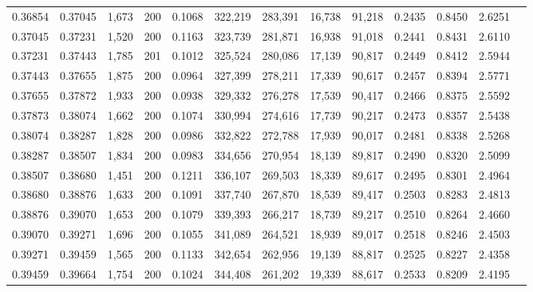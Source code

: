 \begin{tabular}{rrrrrrrrrrrrr}
0.36854 & 0.37045 &  1,673 & 200 &                                     0.1068 & 322,219 & 283,391 &  16,738 &  91,218 & 0.2435 & 0.8450 & 2.6251 \\
0.37045 & 0.37231 &  1,520 & 200 &                                     0.1163 & 323,739 & 281,871 &  16,938 &  91,018 & 0.2441 & 0.8431 & 2.6110 \\
0.37231 & 0.37443 &  1,785 & 201 &                                     0.1012 & 325,524 & 280,086 &  17,139 &  90,817 & 0.2449 & 0.8412 & 2.5944 \\
0.37443 & 0.37655 &  1,875 & 200 &                                     0.0964 & 327,399 & 278,211 &  17,339 &  90,617 & 0.2457 & 0.8394 & 2.5771 \\
0.37655 & 0.37872 &  1,933 & 200 &                                     0.0938 & 329,332 & 276,278 &  17,539 &  90,417 & 0.2466 & 0.8375 & 2.5592 \\
0.37873 & 0.38074 &  1,662 & 200 &                                     0.1074 & 330,994 & 274,616 &  17,739 &  90,217 & 0.2473 & 0.8357 & 2.5438 \\
0.38074 & 0.38287 &  1,828 & 200 &                                     0.0986 & 332,822 & 272,788 &  17,939 &  90,017 & 0.2481 & 0.8338 & 2.5268 \\
0.38287 & 0.38507 &  1,834 & 200 &                                     0.0983 & 334,656 & 270,954 &  18,139 &  89,817 & 0.2490 & 0.8320 & 2.5099 \\
0.38507 & 0.38680 &  1,451 & 200 &                                     0.1211 & 336,107 & 269,503 &  18,339 &  89,617 & 0.2495 & 0.8301 & 2.4964 \\
0.38680 & 0.38876 &  1,633 & 200 &                                     0.1091 & 337,740 & 267,870 &  18,539 &  89,417 & 0.2503 & 0.8283 & 2.4813 \\
0.38876 & 0.39070 &  1,653 & 200 &                                     0.1079 & 339,393 & 266,217 &  18,739 &  89,217 & 0.2510 & 0.8264 & 2.4660 \\
0.39070 & 0.39271 &  1,696 & 200 &                                     0.1055 & 341,089 & 264,521 &  18,939 &  89,017 & 0.2518 & 0.8246 & 2.4503 \\
0.39271 & 0.39459 &  1,565 & 200 &                                     0.1133 & 342,654 & 262,956 &  19,139 &  88,817 & 0.2525 & 0.8227 & 2.4358 \\
0.39459 & 0.39664 &  1,754 & 200 &                                     0.1024 & 344,408 & 261,202 &  19,339 &  88,617 & 0.2533 & 0.8209 & 2.4195 \\

\end{tabular}
